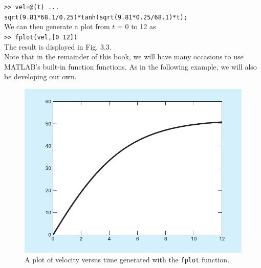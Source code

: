 \documentclass[../main.tex]{subfiles}
\begin{document}
\texttt{>> vel=@(t) ...\\
\indent sqrt(9.81*68.1/0.25)*tanh(sqrt(9.81*0.25/68.1)*t);}\\

\noindent We can then generate a plot from $t$ = 0 to 12 as\\

\texttt{>> fplot(vel,[0 12])}\\

\noindent The result is displayed in Fig. 3.3.\\
\indent Note that in the remainder of this book, we will have many occasions to use MATLAB's
built-in function functions. As in the following example, we will also be developing
our own.\\

\begin{figure}[h]
    \includegraphics{./images/fig_3_3}
    \caption{A plot of velocity versus time generated with the \texttt{fplot} function.}
\end{figure}
\end{document}

